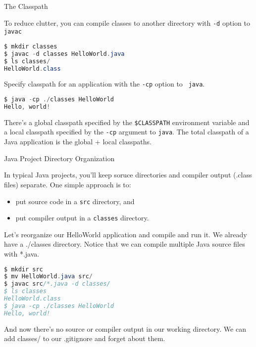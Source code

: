 \documentclass{beamer}
\begin{document}
\begin{frame}[fragile]{The Classpath}


To reduce clutter, you can compile classes to another directory with {\tt -d} option to
{\tt javac} 
\begin{lstlisting}[language=Java]
$ mkdir classes
$ javac -d classes HelloWorld.java
$ ls classes/
HelloWorld.class
\end{lstlisting}
Specify classpath for an application with the {\tt -cp} option to {\tt
  java}.
\begin{lstlisting}[language=Java]
$ java -cp ./classes HelloWorld
Hello, world!
\end{lstlisting}

There's a global classpath specified by the {\tt \$CLASSPATH} environment variable and a local
classpath specified by the {\tt -cp} argument to {\tt java}.  The total classpath of a Java application is the global + local classpaths.

\end{frame}

\begin{frame}[fragile]{Java Project Directory Organization}


In typical Java projects, you'll keep soruce directories and compiler
output (.class files) separate.  One simple approach is to:
\begin{itemize}
\item put source code in a {\tt src} directory, and
\item put compiler output in a {\tt classes} directory.
\end{itemize}

Let's reorganize our HelloWorld application and compile and run it.  We already have a ./classes directory.  Notice that we can compile multiple Java source files with *.java.
\begin{lstlisting}[language=Java]
$ mkdir src
$ mv HelloWorld.java src/
$ javac src/*.java -d classes/
$ ls classes
HelloWorld.class
$ java -cp ./classes HelloWorld
Hello, world!
\end{lstlisting}
\vspace{-.1in}
And now there's no source or compiler output in our working directory.  We can add classes/ to our .gitignore and forget  about them.

\end{frame}
\end{document}
